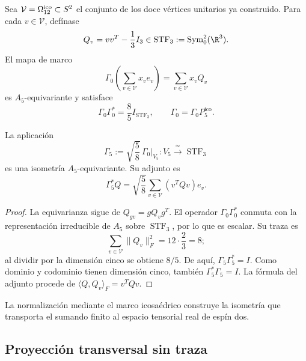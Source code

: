 Sea \(\mathcal V=\Omega_{12}^{\rm ico}\subset S^2\) el conjunto de los
doce vértices unitarios ya construido. Para cada \(v\in\mathcal V\), def\'inase
\begin{equation}
\label{ii:ii:pent:eq:gravity-Qv}
Q_v=vv^T-\frac13I_3\in
\operatorname{STF}_3:=\operatorname{Sym}^2_0(\R^3).
\end{equation}
El mapa de marco
\begin{equation}
\label{ii:ii:pent:eq:gravity-Gamma0}
\Gamma_0\!\left(\sum_{v\in\mathcal V}x_ve_v\right)
=\sum_{v\in\mathcal V}x_vQ_v
\end{equation}
es \(A_5\)-equivariante y satisface
\begin{equation}
\label{ii:ii:pent:eq:gravity-tight-frame}
\Gamma_0\Gamma_0^*=\frac85I_{\operatorname{STF}_3},
\qquad
\Gamma_0=\Gamma_0P^{\mathrm{ico}}_5.
\end{equation}

\begin{theorem}
\label{ii:ii:pent:thm:gravity-gamma5}
La aplicaci\'on
\begin{equation}
\label{ii:ii:pent:eq:gravity-gamma5}
\boxed{
\Gamma_5:=\sqrt{\frac58}\,\Gamma_0|_{V_5}:
V_5\xrightarrow{\ \simeq\ }\operatorname{STF}_3}
\end{equation}
es una isometr\'ia \(A_5\)-equivariante. Su adjunto es
\begin{equation}
\label{ii:ii:pent:eq:gravity-gamma5-adjoint}
\Gamma_5^*Q=\sqrt{\frac58}
\sum_{v\in\mathcal V}(v^TQv)e_v.
\end{equation}
\end{theorem}

\begin{proof}
La equivarianza sigue de \(Q_{gv}=gQ_vg^T\). El operador
\(\Gamma_0\Gamma_0^*\) conmuta con la representaci\'on irreducible de
\(A_5\) sobre \(\operatorname{STF}_3\), por lo que es escalar. Su traza
es
\[
\sum_{v\in\mathcal V}\|Q_v\|_F^2
=12\cdot\frac23=8;
\]
al dividir por la dimensi\'on cinco se obtiene \(8/5\). De aqu\'i,
\(\Gamma_5\Gamma_5^*=I\). Como dominio y codominio tienen dimensi\'on
cinco, tambi\'en \(\Gamma_5^*\Gamma_5=I\). La f\'ormula del adjunto
procede de \(\langle Q,Q_v\rangle_F=v^TQv\).
\end{proof}

La normalización mediante el marco icosaédrico construye la isometría que
transporta el sumando finito al espacio tensorial real de espín dos.

\subsection{Proyecci\'on transversal sin traza}

